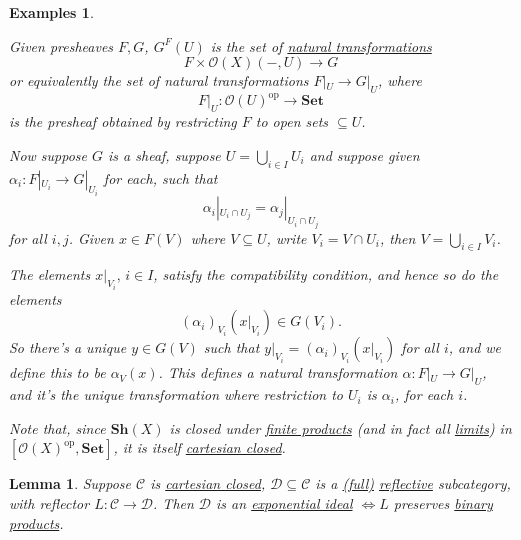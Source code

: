 \documentclass{article}
\newtheorem{nlemma}[nthm]{Lemma}
\newtheorem{nexample}[nthm]{Examples}
\begin{document}
\begin{nexample}
\begin{enumerate}[label=(\alph*)]
      Given presheaves $F,G$, $G^F(U)$ is the set of \hyperlink{def:nattrans}{natural transformations}
      \begin{equation*}
        F \times \mathcal{O}(X)(-, U) \to G
      \end{equation*}
      or equivalently the set of natural transformations $F|_U \to G|_U$, where
      \begin{equation*}F|_U: \mathcal{O}(U)^{\text{op}} \to \mathbf{Set}\end{equation*}
      is the presheaf obtained by restricting $F$ to open sets $\subseteq U$.

      Now suppose $G$ is a sheaf, suppose $U = \bigcup_{i \in I} U_i$ and suppose given $\alpha_i: F|_{U_i} \to G|_{U_i}$ for each, such that
      \begin{equation*}\alpha_i|_{U_i \cap U_j} = \alpha_j|_{U_i \cap U_j}\end{equation*}
      for all $i,j$.
      Given $x \in F(V)$ where $V \subseteq U$, write $V_i = V \cap U_i$, then $V = \bigcup_{i \in I} V_i$.

      The elements $x|_{V_i},\, i \in I$, satisfy the compatibility condition, and hence so do the elements
      \begin{equation*}(\alpha_i)_{V_i} (x|_{V_i}) \in G(V_i).\end{equation*}
      So there's a unique $y \in G(V)$ such that $y|_{V_i} = (\alpha_i)_{V_i} (x|_{V_i})$ for all $i$, and we define this to be $\alpha_V(x)$.
      This defines a natural transformation $\alpha:F|_U \to G|_U$, and it's the unique transformation where restriction to $U_i$ is $\alpha_i$, for each $i$.

      Note that, since $\mathbf{Sh}(X)$ is closed under \hyperlink{def:lprod}{finite products} (and in fact all \hyperlink{def:limit}{limits}) in $[\mathcal{O}(X)^{\text{op}}, \mathbf{Set}]$, it is itself \hyperlink{def:cc}{cartesian closed}.
  \end{enumerate}
\end{nexample}
\begin{nlemma}\label{lem:6.13}
  Suppose $\mathscr{C}$ is \hyperlink{def:cc}{cartesian closed}, $\mathscr{D} \subseteq \mathscr{C}$ is a \hyperlink{def:fulls}{(full)} \hyperlink{def:refl}{reflective} subcategory, with reflector $L: \mathscr{C} \to \mathscr{D}$.
  Then $\mathscr{D}$ is an \hyperlink{def:expIdeal}{exponential ideal} $\iff L$ preserves \hyperlink{def:lprod}{binary products}.
\end{nlemma}
\end{document}
